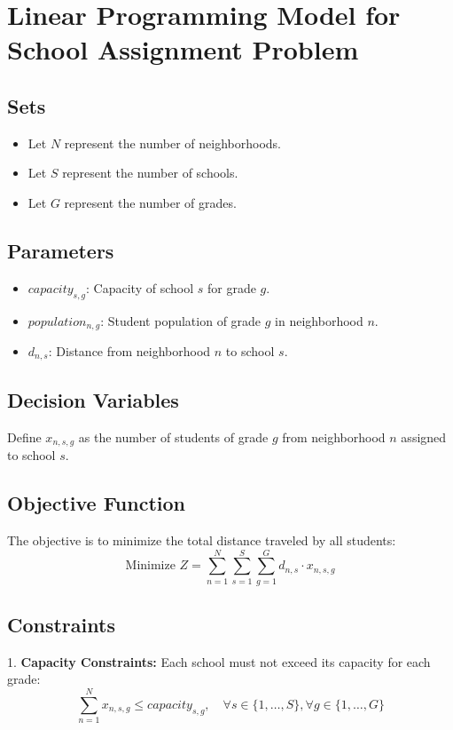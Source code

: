 \documentclass{article}
\begin{document}
\section*{Linear Programming Model for School Assignment Problem}

\subsection*{Sets}
\begin{itemize}
    \item Let \( N \) represent the number of neighborhoods.
    \item Let \( S \) represent the number of schools.
    \item Let \( G \) represent the number of grades.
\end{itemize}

\subsection*{Parameters}
\begin{itemize}
    \item \( capacity_{s,g} \): Capacity of school \( s \) for grade \( g \).
    \item \( population_{n,g} \): Student population of grade \( g \) in neighborhood \( n \).
    \item \( d_{n,s} \): Distance from neighborhood \( n \) to school \( s \).
\end{itemize}

\subsection*{Decision Variables}
Define \( x_{n,s,g} \) as the number of students of grade \( g \) from neighborhood \( n \) assigned to school \( s \).

\subsection*{Objective Function}
The objective is to minimize the total distance traveled by all students:
\[
\text{Minimize } Z = \sum_{n=1}^{N} \sum_{s=1}^{S} \sum_{g=1}^{G} d_{n,s} \cdot x_{n,s,g}
\]

\subsection*{Constraints}

1. \textbf{Capacity Constraints:}
   Each school must not exceed its capacity for each grade:
   \[
   \sum_{n=1}^{N} x_{n,s,g} \leq capacity_{s,g}, \quad \forall s \in \{1, \ldots, S\}, \forall g \in \{1, \ldots, G\}
   \]
\end{document}
